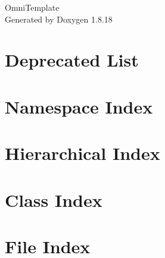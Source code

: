 \let\mypdfximage\pdfximage\def\pdfximage{\immediate\mypdfximage}\documentclass[twoside]{book}
\newcommand{\+}{\discretionary{\mbox{\scriptsize$\hookleftarrow$}}{}{}}
\newcommand{\clearemptydoublepage}{%
  \newpage{\pagestyle{empty}\cleardoublepage}%
}
\begin{document}
\hypersetup{pageanchor=false,
             bookmarksnumbered=true,
             pdfencoding=unicode
            }
\begin{titlepage}
\vspace*{7cm}
\begin{center}%
{\Large Omni\+Template }\\
\vspace*{1cm}
{\large Generated by Doxygen 1.8.18}\\
\end{center}
\end{titlepage}
\clearemptydoublepage
{}
\tableofcontents
\clearemptydoublepage
{}
\hypersetup{pageanchor=true}

\chapter{Deprecated List}
\label{deprecated}

\chapter{Namespace Index}

\chapter{Hierarchical Index}

\chapter{Class Index}

\chapter{File Index}

\end{document}
